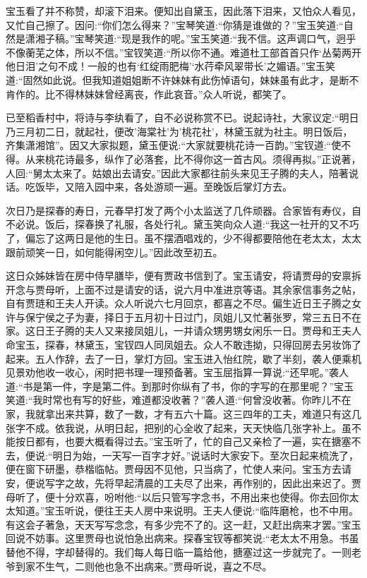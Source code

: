 \begin{parag}
    宝玉看了并不称赞，却滚下泪来。便知出自黛玉，因此落下泪来，又怕众人看见，又忙自己擦了。因问:“你们怎么得来？”宝琴笑道:“你猜是谁做的？”宝玉笑道:“自然是潇湘子稿。”宝琴笑道:“现是我作的呢。”宝玉笑道:“我不信。这声调口气，迥乎不像蘅芜之体，所以不信。”宝钗笑道:“所以你不通。难道杜工部首首只作‘丛菊两开他日泪’之句不成！一般的也有‘红绽雨肥梅’‘水荇牵风翠带长’之媚语。”宝玉笑道:“固然如此说。但我知道姐姐断不许妹妹有此伤悼语句，妹妹虽有此才，是断不肯作的。比不得林妹妹曾经离丧，作此哀音。”众人听说，都笑了。
\end{parag}


\begin{parag}
    已至稻香村中，将诗与李纨看了，自不必说称赏不已。说起诗社，大家议定:“明日乃三月初二日，就起社，便改'海棠社'为'桃花社'，林黛玉就为社主。明日饭后，齐集潇湘馆”。因又大家拟题，黛玉便说:“大家就要桃花诗一百韵。”宝钗道:“使不得。从来桃花诗最多，纵作了必落套，比不得你这一首古风。须得再拟。”正说著，人回:“舅太太来了。姑娘出去请安。”因此大家都往前头来见王子腾的夫人，陪著说话。吃饭毕，又陪入园中来，各处游顽一遍。至晚饭后掌灯方去。
\end{parag}


\begin{parag}
    次日乃是探春的寿日，元春早打发了两个小太监送了几件顽器。合家皆有寿仪，自不必说。饭后，探春换了礼服，各处行礼。黛玉笑向众人道:“我这一社开的又不巧了，偏忘了这两日是他的生日。虽不摆酒唱戏的，少不得都要陪他在老太太，太太跟前顽笑一日，如何能得闲空儿。”因此改至初五。
\end{parag}


\begin{parag}
    这日众姊妹皆在房中侍早膳毕，便有贾政书信到了。宝玉请安，将请贾母的安禀拆开念与贾母听，上面不过是请安的话，说六月中准进京等语。其余家信事务之帖，自有贾琏和王夫人开读。众人听说六七月回京，都喜之不尽。偏生近日王子腾之女许与保宁侯之子为妻，择日于五月初十日过门，凤姐儿又忙著张罗，常三五日不在家。这日王子腾的夫人又来接凤姐儿，一并请众甥男甥女闲乐一日。贾母和王夫人命宝玉，探春，林黛玉，宝钗四人同凤姐去。众人不敢违拗，只得回房去另妆饰了起来。五人作辞，去了一日，掌灯方回。宝玉进入怡红院，歇了半刻，袭人便乘机见景劝他收一收心，闲时把书理一理预备著。宝玉屈指算一算说:“还早呢。”袭人道:“书是第一件，字是第二件。到那时你纵有了书，你的字写的在那里呢？”宝玉笑道:“我时常也有写的好些，难道都没收著？”袭人道:“何曾没收著。你昨儿不在家，我就拿出来共算，数了一数，才有五六十篇。这三四年的工夫，难道只有这几张字不成。依我说，从明日起，把别的心全收了起来，天天快临几张字补上。虽不能按日都有，也要大概看得过去。”宝玉听了，忙的自己又亲检了一遍，实在搪塞不去，便说:“明日为始，一天写一百字才好。”说话时大家安下。至次日起来梳洗了，便在窗下研墨，恭楷临帖。贾母因不见他，只当病了，忙使人来问。宝玉方去请安，便说写字之故，先将早起清晨的工夫尽了出来，再作别的，因此出来迟了。贾母听了，便十分欢喜，吩咐他:“以后只管写字念书，不用出来也使得。你去回你太太知道。”宝玉听说，便往王夫人房中来说明。王夫人便说:“临阵磨枪，也不中用。有这会子著急，天天写写念念，有多少完不了的。这一赶，又赶出病来才罢。”宝玉回说不妨事。这里贾母也说怕急出病来。探春宝钗等都笑说:“老太太不用急。书虽替他不得，字却替得的。我们每人每日临一篇给他，搪塞过这一步就完了。一则老爷到家不生气，二则他也急不出病来。”贾母听说，喜之不尽。
\end{parag}


